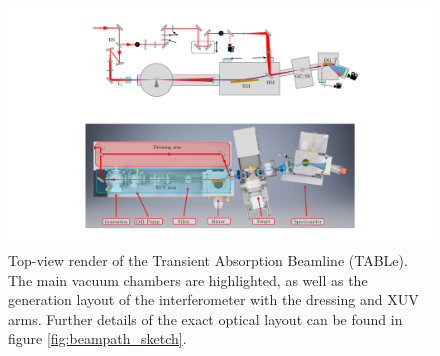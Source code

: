 \begin{figure}
	\centering
	\includegraphics[width=1.0\textwidth]{figures/Beamline/CAD_beamline_top_view.pdf}
	\caption[Top-view render of the TABLe]{Top-view render of the Transient Absorption Beamline (TABLe).  The main vacuum chambers are highlighted, as well as the generation layout of the interferometer with the dressing and XUV arms.  Further details of the exact optical layout can be found in figure \ref{fig:beampath_sketch}.}
	\label{fig:CAD_beamline_top_view}
\end{figure}

